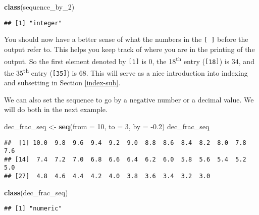 \documentclass[]{tufte-book}
\newenvironment{Shaded}{\begin{snugshade}}{\end{snugshade}}
\newcommand{\DataTypeTok}[1]{\textcolor[rgb]{0.13,0.29,0.53}{#1}}
\newcommand{\DecValTok}[1]{\textcolor[rgb]{0.00,0.00,0.81}{#1}}
\newcommand{\FloatTok}[1]{\textcolor[rgb]{0.00,0.00,0.81}{#1}}
\newcommand{\KeywordTok}[1]{\textcolor[rgb]{0.13,0.29,0.53}{\textbf{#1}}}
\newcommand{\NormalTok}[1]{#1}
\newcommand{\StringTok}[1]{\textcolor[rgb]{0.31,0.60,0.02}{#1}}
\begin{document}
\begin{Shaded}
\begin{Highlighting}[]
\KeywordTok{class}\NormalTok{(sequence_by_}\DecValTok{2}\NormalTok{)}
\end{Highlighting}
\end{Shaded}

\begin{verbatim}
## [1] "integer"
\end{verbatim}

You should now have a better sense of what the numbers in the \texttt{{[}\ {]}} before the output refer to. This helps you keep track of where you are in the printing of the output. So the first element denoted by \texttt{{[}1{]}} is 0, the 18\textsuperscript{th} entry (\texttt{{[}18{]}}) is 34, and the 35\textsuperscript{th} entry (\texttt{{[}35{]}}) is 68. This will serve as a nice introduction into indexing and subsetting in Section \ref{index-sub}.

We can also set the sequence to go by a negative number or a decimal value. We will do both in the next example.

\begin{Shaded}
\begin{Highlighting}[]
\NormalTok{dec_frac_seq <-}\StringTok{ }\KeywordTok{seq}\NormalTok{(}\DataTypeTok{from =} \DecValTok{10}\NormalTok{, }\DataTypeTok{to =} \DecValTok{3}\NormalTok{, }\DataTypeTok{by =} \FloatTok{-0.2}\NormalTok{)}
\NormalTok{dec_frac_seq}
\end{Highlighting}
\end{Shaded}

\begin{verbatim}
##  [1] 10.0  9.8  9.6  9.4  9.2  9.0  8.8  8.6  8.4  8.2  8.0  7.8  7.6
## [14]  7.4  7.2  7.0  6.8  6.6  6.4  6.2  6.0  5.8  5.6  5.4  5.2  5.0
## [27]  4.8  4.6  4.4  4.2  4.0  3.8  3.6  3.4  3.2  3.0
\end{verbatim}

\begin{Shaded}
\begin{Highlighting}[]
\KeywordTok{class}\NormalTok{(dec_frac_seq)}
\end{Highlighting}
\end{Shaded}

\begin{verbatim}
## [1] "numeric"
\end{verbatim}

\vspace*{0.2in}
\end{document}
